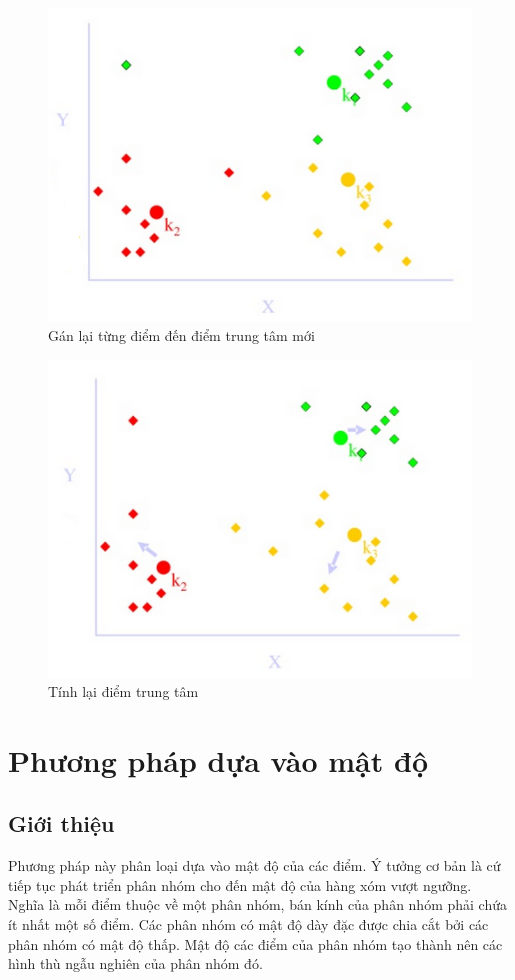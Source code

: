 \begin{figure}[htp]
\centering
\includegraphics{Images/k_means_04}
\caption{Gán lại từng điểm đến điểm trung tâm mới}
\label{fig:k_means_01}
\end{figure}

\begin{figure}[htp]
\centering
\includegraphics{Images/k_means_05}
\caption{Tính lại điểm trung tâm}
\label{fig:k_means_01}
\end{figure}

\clearpage
\section{Phương pháp dựa vào mật độ}
\subsection{Giới thiệu}
\hspace{10mm}Phương pháp này phân loại dựa vào mật độ của các điểm. Ý tưởng cơ bản là cứ tiếp tục phát triển phân nhóm cho đến mật độ của hàng xóm vượt ngưỡng. Nghĩa là mỗi điểm thuộc về một phân nhóm, bán kính của phân nhóm phải chứa ít nhất một số điểm. Các phân nhóm có mật độ dày đặc được chia cắt bởi các phân nhóm có mật độ thấp. Mật độ các điểm của phân nhóm tạo thành nên các hình thù ngẫu nghiên của phân nhóm đó.\\

